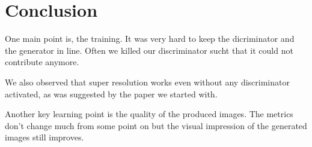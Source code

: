 \documentclass[10pt,twocolumn,letterpaper]{article}
\begin{document}
\section{Conclusion}
\label{sec:conclusion}
One main point is, the training. It was very hard to keep the
dicriminator and the generator in line. Often we killed our
discriminator sucht that it could not contribute anymore.

We also observed that super resolution works even without any
discriminator activated, as was suggested by the paper we started
with.

Another key learning point is the quality of the produced images. The
metrics don't change much from some point on but the visual impression
of the generated images still improves.





\appendix

{
  \nocite{*}                      %
  \small
  
  
  
}
\end{document}
